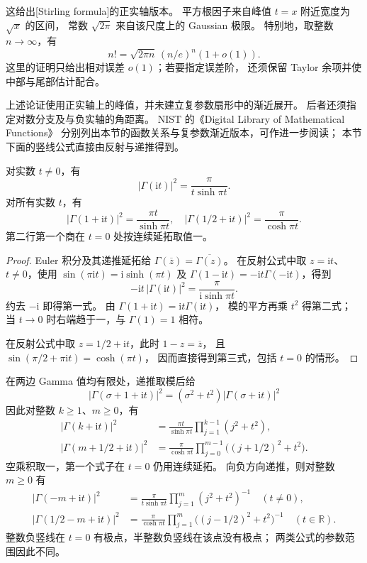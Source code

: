 这给出[Stirling formula]的正实轴版本。
平方根因子来自峰值 \(t=x\) 附近宽度为 \(\sqrt x\) 的区间，
常数 \(\sqrt{2\pi}\) 来自该尺度上的 Gaussian 极限。
特别地，取整数 \(n\to\infty\)，有
\[
 n!=\sqrt{2\pi n}\,(n/e)^n(1+o(1)).
\]
这里的证明只给出相对误差 \(o(1)\)；若要指定误差阶，
还须保留 Taylor 余项并使中部与尾部估计配合。

\ProseParagraphBreak
上述论证使用正实轴上的峰值，并未建立复参数扇形中的渐近展开。
后者还须指定对数分支及与负实轴的角距离。
NIST 的《Digital Library of Mathematical Functions》
\cite[Sections 5.5 and 5.11]{NationalInstituteofStandardsNIST}
分别列出本节的函数关系与复参数渐近版本，可作进一步阅读；
本节下面的竖线公式直接由反射与递推得到。

\begin{proposition}[三条竖线上的精确模值]\label{b3:prop:21-vertical-modulus}
对实数 \(t\ne0\)，有
\[
 |\Gamma(\mathrm it)|^2=\frac\pi{t\sinh\pi t}.
\]
对所有实数 \(t\)，有
\[
 |\Gamma(1+\mathrm it)|^2=\frac{\pi t}{\sinh\pi t},\quad
 |\Gamma(1/2+\mathrm it)|^2=\frac\pi{\cosh\pi t}.
\]
第二行第一个商在 \(t=0\) 处按连续延拓取值一。
\end{proposition}
\begin{proof}
Euler 积分及其递推延拓给
\(\Gamma(\overline z)=\overline{\Gamma(z)}\)。
在反射公式中取 \(z=\mathrm it\)、\(t\ne0\)，使用
\(\sin(\pi\mathrm it)=\mathrm i\sinh(\pi t)\) 及
\(\Gamma(1-\mathrm it)=-\mathrm it\Gamma(-\mathrm it)\)，得到
\[
 -\mathrm it\,|\Gamma(\mathrm it)|^2
 =\frac\pi{\mathrm i\sinh\pi t}.
\]
约去 \(-\mathrm i\) 即得第一式。
由 \(\Gamma(1+\mathrm it)=\mathrm it\Gamma(\mathrm it)\)，
模的平方再乘 \(t^2\) 得第二式；
当 \(t\to0\) 时右端趋于一，与 \(\Gamma(1)=1\) 相符。

在反射公式中取 \(z=1/2+\mathrm it\)，此时 \(1-z=\overline z\)，
且 \(\sin(\pi/2+\pi\mathrm it)=\cosh(\pi t)\)，
因而直接得到第三式，包括 \(t=0\) 的情形。
\end{proof}

在两边 Gamma 值均有限处，递推取模后给
\[
 |\Gamma(\sigma+1+\mathrm it)|^2
 =(\sigma^2+t^2)|\Gamma(\sigma+\mathrm it)|^2
\]
因此对整数 \(k\ge1\)、\(m\ge0\)，有
\[
 \begin{aligned}
 |\Gamma(k+\mathrm it)|^2
 &=\frac{\pi t}{\sinh\pi t}
        \prod_{j=1}^{k-1}(j^2+t^2),\\
 |\Gamma(m+1/2+\mathrm it)|^2
 &=\frac\pi{\cosh\pi t}
        \prod_{j=0}^{m-1}\bigl((j+1/2)^2+t^2\bigr).
 \end{aligned}
\]
空乘积取一，第一个式子在 \(t=0\) 仍用连续延拓。
向负方向递推，则对整数 \(m\ge0\) 有
\[
 \begin{aligned}
 |\Gamma(-m+\mathrm it)|^2
 &=\frac\pi{t\sinh\pi t}
        \prod_{j=1}^{m}(j^2+t^2)^{-1}\quad(t\ne0),\\
 |\Gamma(1/2-m+\mathrm it)|^2
 &=\frac\pi{\cosh\pi t}
        \prod_{j=1}^{m}\bigl((j-1/2)^2+t^2\bigr)^{-1}
        \quad(t\in\mathbb R).
 \end{aligned}
\]
整数负竖线在 \(t=0\) 有极点，半整数负竖线在该点没有极点；
两类公式的参数范围因此不同。

